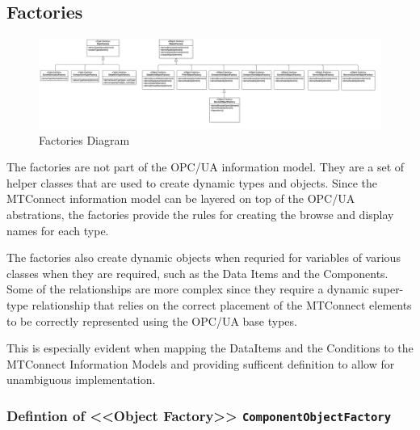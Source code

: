 \FloatBarrier

\subsection{Factories}

\begin{figure}
  \centering
    \includegraphics[width=1.0\textwidth]{diagrams/Factories.png}
  \caption{Factories Diagram}
  \label{fig:Factories}
\end{figure}

\FloatBarrier


The factories are not part of the OPC/UA information model. They are a set of helper 
classes that are used to create dynamic types and objects. Since the MTConnect 
information model can be layered on top of the OPC/UA abstrations, the factories
provide the rules for creating the browse and display names for each type.

The factories also create dynamic objects when requried for variables of various
classes when they are required, such as the Data Items and the Components. Some of the
relationships are more complex since they require a dynamic super-type relationship that
relies on the correct placement of the MTConnect elements to be correctly 
represented using the OPC/UA base types.

This is especially evident when mapping the DataItems and the Conditions to the 
MTConnect Information Models and providing sufficent definition to allow for 
unambiguous implementation.

\subsubsection{Defintion of <<Object Factory>> \texttt{ComponentObjectFactory}} \label{type:ComponentObjectFactory}

\FloatBarrier



